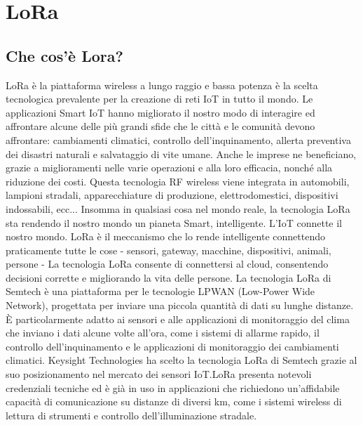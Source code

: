\documentclass[a4paper]{report} %
\begin{document}
\section{LoRa}
\subsection{Che cos'è Lora?}
LoRa è la piattaforma wireless a lungo raggio e bassa potenza è la scelta tecnologica prevalente per la creazione di reti IoT in tutto il mondo. Le applicazioni Smart IoT hanno migliorato il nostro modo di interagire ed affrontare alcune delle più grandi sfide che le città e le comunità devono affrontare: cambiamenti climatici, controllo dell'inquinamento, allerta preventiva dei disastri naturali e salvataggio di vite umane. Anche le imprese ne beneficiano, grazie a miglioramenti nelle varie operazioni e alla loro efficacia, nonché alla riduzione dei costi. Questa tecnologia RF wireless viene integrata in automobili, lampioni stradali, apparecchiature di produzione, elettrodomestici, dispositivi indossabili, ecc... Insomma in qualsiasi cosa nel mondo reale, la tecnologia LoRa sta rendendo il nostro mondo un pianeta Smart, intelligente. L'IoT connette il nostro mondo. LoRa è il meccanismo che lo rende intelligente connettendo praticamente tutte le cose - sensori, gateway, macchine, dispositivi, animali, persone - La tecnologia LoRa consente di connettersi al cloud, consentendo decisioni corrette e migliorando la vita delle persone. La tecnologia LoRa di Semtech è una piattaforma per le tecnologie LPWAN (Low-Power Wide Network), progettata per inviare una piccola quantità di dati su lunghe distanze. È particolarmente adatto ai sensori e alle applicazioni di monitoraggio del clima che inviano i dati alcune volte all'ora, come i sistemi di allarme rapido, il controllo dell'inquinamento e le applicazioni di monitoraggio dei cambiamenti climatici. Keysight Technologies ha scelto la tecnologia LoRa di Semtech grazie al suo posizionamento nel mercato dei sensori IoT.LoRa presenta notevoli credenziali tecniche ed è già in uso in applicazioni che richiedono un'affidabile capacità di comunicazione su distanze di diversi km, come i sistemi wireless di lettura di strumenti e controllo dell'illuminazione stradale. \cite{art:rif.24}
\end{document}
